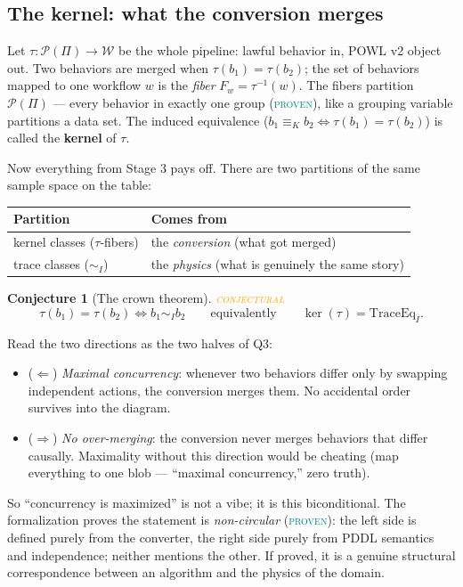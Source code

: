 \documentclass[11pt]{article}
\newcommand{\PROVEN}{\textcolor{teal}{\textsc{proven}}}
\newcommand{\CONJECTURAL}{\textcolor{orange}{\textsc{conjectural}}}
\theoremstyle{definition}
\theoremstyle{plain}
\newtheorem{conjecture}[definition]{Conjecture}
\theoremstyle{remark}
\begin{document}
\subsection{The kernel: what the conversion merges}

Let $\tau : \mathcal{P}(\Pi) \to \mathcal{W}$ be the whole pipeline: lawful
behavior in, POWL v2 object out. Two behaviors are merged when
$\tau(b_1) = \tau(b_2)$; the set of behaviors mapped to one workflow $w$ is
the \emph{fiber} $F_w = \tau^{-1}(w)$. The fibers partition
$\mathcal{P}(\Pi)$ --- every behavior in exactly one group (\PROVEN), like a
grouping variable partitions a data set. The induced equivalence
($b_1 \equiv_K b_2 \iff \tau(b_1) = \tau(b_2)$) is called the
\textbf{kernel} of $\tau$.

Now everything from Stage 3 pays off. There are two partitions of the same
sample space on the table:

\begin{center}
\begin{tabular}{@{}ll@{}}
\toprule
Partition & Comes from \\
\midrule
kernel classes ($\tau$-fibers) & the \emph{conversion} (what got merged) \\
trace classes ($\sim_I$) & the \emph{physics} (what is genuinely the same story) \\
\bottomrule
\end{tabular}
\end{center}

\begin{conjecture}[The crown theorem]\CONJECTURAL\label{conj:crown}
\[
  \tau(b_1) = \tau(b_2) \iff b_1 \sim_I b_2
  \qquad\text{equivalently}\qquad
  \ker(\tau) = \mathrm{TraceEq}_I .
\]
\end{conjecture}

Read the two directions as the two halves of Q3:
\begin{itemize}[nosep]
  \item ($\Leftarrow$) \emph{Maximal concurrency}: whenever two behaviors
  differ only by swapping independent actions, the conversion merges them.
  No accidental order survives into the diagram.
  \item ($\Rightarrow$) \emph{No over-merging}: the conversion never merges
  behaviors that differ causally. Maximality without this direction would be
  cheating (map everything to one blob --- ``maximal concurrency,'' zero
  truth).
\end{itemize}

So ``concurrency is maximized'' is not a vibe; it is this biconditional.
The formalization proves the statement is \emph{non-circular} (\PROVEN):
the left side is defined purely from the converter, the right side purely
from PDDL semantics and independence; neither mentions the other. If proved,
it is a genuine structural correspondence between an algorithm and the
physics of the domain.
\end{document}

